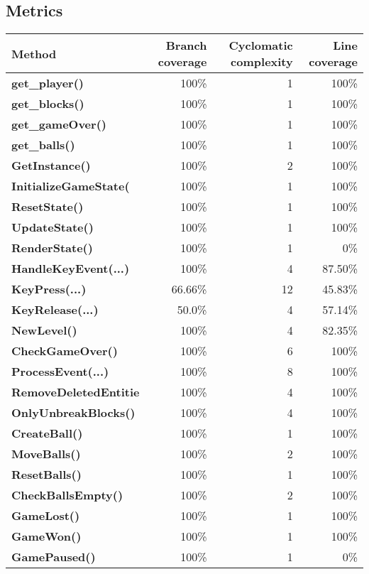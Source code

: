 \documentclass[a4paper,landscape,10pt]{article}
\begin{document}
\subsection{Metrics}
\begin{longtable}[l]{|l|r|r|r|}
\hline
\textbf{Method} & \textbf{Branch coverage} & \textbf{Cyclomatic complexity} & \textbf{Line coverage}\\
\hline
\textbf{get\_player()} & 100\% & 1 & 100\%\\
\hline
\textbf{get\_blocks()} & 100\% & 1 & 100\%\\
\hline
\textbf{get\_gameOver()} & 100\% & 1 & 100\%\\
\hline
\textbf{get\_balls()} & 100\% & 1 & 100\%\\
\hline
\textbf{GetInstance()} & 100\% & 2 & 100\%\\
\hline
\textbf{InitializeGameState(} & 100\% & 1 & 100\%\\
\hline
\textbf{ResetState()} & 100\% & 1 & 100\%\\
\hline
\textbf{UpdateState()} & 100\% & 1 & 100\%\\
\hline
\textbf{RenderState()} & 100\% & 1 & 0\%\\
\hline
\textbf{HandleKeyEvent(...)} & 100\% & 4 & 87.50\%\\
\hline
\textbf{KeyPress(...)} & 66.66\% & 12 & 45.83\%\\
\hline
\textbf{KeyRelease(...)} & 50.0\% & 4 & 57.14\%\\
\hline
\textbf{NewLevel()} & 100\% & 4 & 82.35\%\\
\hline
\textbf{CheckGameOver()} & 100\% & 6 & 100\%\\
\hline
\textbf{ProcessEvent(...)} & 100\% & 8 & 100\%\\
\hline
\textbf{RemoveDeletedEntitie} & 100\% & 4 & 100\%\\
\hline
\textbf{OnlyUnbreakBlocks()} & 100\% & 4 & 100\%\\
\hline
\textbf{CreateBall()} & 100\% & 1 & 100\%\\
\hline
\textbf{MoveBalls()} & 100\% & 2 & 100\%\\
\hline
\textbf{ResetBalls()} & 100\% & 1 & 100\%\\
\hline
\textbf{CheckBallsEmpty()} & 100\% & 2 & 100\%\\
\hline
\textbf{GameLost()} & 100\% & 1 & 100\%\\
\hline
\textbf{GameWon()} & 100\% & 1 & 100\%\\
\hline
\textbf{GamePaused()} & 100\% & 1 & 0\%\\

\end{longtable}
\end{document}
